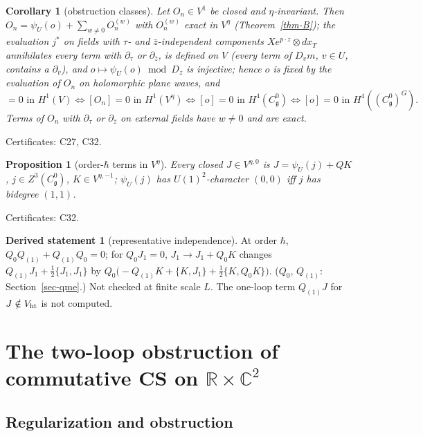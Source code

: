 \documentclass[10pt,a4paper]{article}
\numberwithin{equation}{section}
\newtheorem{proposition}[theorem]{Proposition}
\newtheorem{corollary}[theorem]{Corollary}
\theoremstyle{definition}
\newtheorem{dstatement}[theorem]{Derived statement}
\theoremstyle{remark}
\newcommand{\g}{\mathfrak g}
\newcommand{\zb}{\bar z}
\newcommand{\Vht}{V_{\rm ht}}
\newcommand{\Veta}{V^{\eta}}
\newcommand{\Cg}{C^0_{\g}}
\newcommand{\cert}[1]{\par\noindent\textup{Certificates: #1.}\par}
\begin{document}
\begin{corollary}[obstruction classes]\label{cor-O2}
Let $O_n\in V^1$ be closed and $\eta$-invariant. Then $O_n=\psi_U(o)+\sum_{w\ne0}O_n^{(w)}$ with $O_n^{(w)}$ exact in $\Veta$ (Theorem~\ref{thm-B}); the evaluation $j^*$ on fields with $\tau$- and $\zb$-independent components $Xe^{p\cdot z}\otimes dx_T$ annihilates every term with $\partial_\tau$ or $\partial_{\zb}$, is defined on $V$ (every term of $D_vm$, $v\in U$, contains a $\partial_v$), and $o\mapsto\psi_U(o)\bmod D_z$ is injective; hence $o$ is fixed by the evaluation of $O_n$ on holomorphic plane waves, and
\begin{equation}
[O_n]=0\text{ in }H^1(V)\iff[O_n]=0\text{ in }H^1(\Veta)\iff[o]=0\text{ in }H^4(\Cg)\iff[o]=0\text{ in }H^4((\Cg)^G).
\end{equation}
Terms of $O_n$ with $\partial_\tau$ or $\partial_{\zb}$ on external fields have $w\neq0$ and are exact.
\end{corollary}
\cert{C27, C32}

\begin{proposition}[order-$\hbar$ terms in $\Veta$]\label{prop-J1eta}
Every closed $J\in V^{\eta,0}$ is $J=\psi_U(j)+QK$, $j\in Z^3(\Cg)$, $K\in V^{\eta,-1}$; $\psi_U(j)$ has $U(1)^2$-character $(0,0)$ iff $j$ has bidegree $(1,1)$.
\end{proposition}
\cert{C32}

\begin{dstatement}[representative independence]\label{ds-homotopy}
At order $\hbar$, $Q_0Q_{(1)}+Q_{(1)}Q_0=0$; for $Q_0J_1=0$, $J_1\to J_1+Q_0K$ changes $Q_{(1)}J_1+\frac12\{J_1,J_1\}$ by $Q_0\big(-Q_{(1)}K+\{K,J_1\}+\frac12\{K,Q_0K\}\big)$. ($Q_0$, $Q_{(1)}$: Section~\ref{sec-qme}.) Not checked at finite scale $L$. The one-loop term $Q_{(1)}J$ for $J\notin\Vht$ is not computed.
\end{dstatement}

\section{\texorpdfstring{The two-loop obstruction of commutative CS on $\mathbb R\times\mathbb C^2$}{The two-loop obstruction of commutative CS on R x C2}}\label{sec-obs}

\subsection{Regularization and obstruction}\label{sec-reg}
\end{document}
